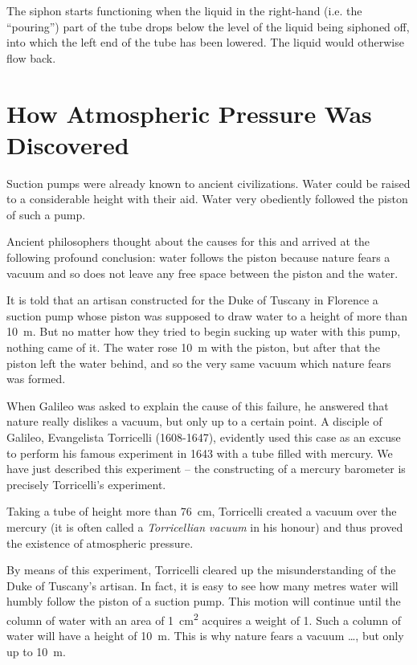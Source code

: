 The siphon starts functioning when the liquid in the
right-hand (i.e. the ``pouring'') part of the tube drops
below the level of the liquid being siphoned off, into
which the left end of the tube has been lowered. The
liquid would otherwise flow back.

\section{How Atmospheric Pressure Was Discovered}

Suction pumps were already known to ancient civilizations. Water could be raised to a considerable height with their aid. Water very obediently followed the piston of such a pump.

Ancient philosophers thought about the causes for this and arrived at the following profound conclusion: water follows the piston because nature fears a vacuum and so does not leave any free space between the piston and the water.

It is told that an artisan constructed for the Duke of Tuscany in Florence a suction pump whose piston was supposed to draw water to a height of more than \SI{10}{\meter}. But no matter how they tried to begin sucking up water with this pump, nothing came of it. The water rose \SI{10}{\meter} with the piston, but after that the piston left the water behind, and so the very same vacuum which nature fears was formed. 

When Galileo was asked to explain the cause of this failure, he answered that nature really dislikes a vacuum, but only up to a certain point. A disciple of Galileo, Evangelista Torricelli (1608-1647), evidently used this case as an excuse to perform his famous experiment in 1643 with a tube filled with mercury. We have just described this experiment -- the constructing of a mercury barometer is precisely Torricelli's experiment.

Taking a tube of height more than \SI{76}{\centi\meter}, Torricelli created a vacuum over the mercury (it is often called a \emph{Torricellian vacuum} in his honour) and thus proved the existence of atmospheric pressure.

By means of this experiment, Torricelli cleared up the misunderstanding of the Duke of Tuscany's artisan. In fact, it is easy to see how many metres water will humbly follow the piston of a suction pump. This motion will continue until the column of water with an area of \SI{1}{\centi\meter\squared} acquires a weight of \SI{1}{\kgf}. Such a column of water will have a height of \SI{10}{\meter}. This is why nature fears a vacuum \ldots{}, but only up to \SI{10}{\meter}.

